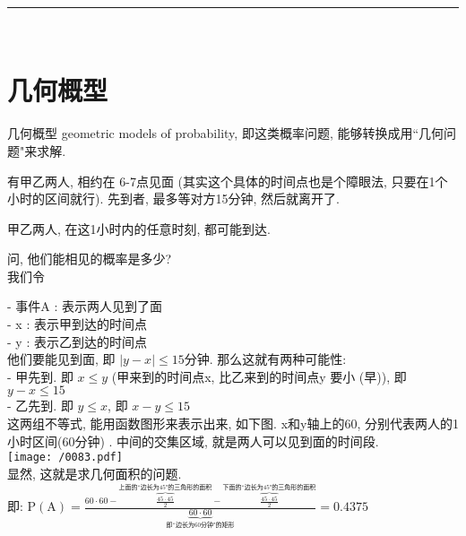 \documentclass[UTF8]{ctexart}
\begin{document}
~\\
\hrule
~\\


\section{几何概型}


几何概型 geometric models of probability, 即这类概率问题, 能够转换成用``几何问题"来求解.

\begin{myEnvSample}
	有甲乙两人, 相约在 6-7点见面 (其实这个具体的时间点也是个障眼法, 只要在1个小时的区间就行). 先到者, 最多等对方15分钟, 然后就离开了.
	
	甲乙两人, 在这1小时内的任意时刻, 都可能到达.
	
	问, 他们能相见的概率是多少? \\
	
	我们令 
	
	- 事件A : 表示两人见到了面 \\
	- x : 表示甲到达的时间点 \\
	- y : 表示乙到达的时间点 \\
	
	他们要能见到面, 即 $|y-x| \leq 15$分钟. 那么这就有两种可能性: \\
	-  甲先到. 即 $x \leq y$ (甲来到的时间点x, 比乙来到的时间点y 要小 (早)), 即 $ y-x \leq 15$ \\
	-  乙先到. 即 $y \leq x$, 即 $ x-y \leq 15$ \\	
	
	这两组不等式, 能用函数图形来表示出来, 如下图. x和y轴上的60, 分别代表两人的1小时区间(60分钟) . 中间的交集区域, 就是两人可以见到面的时间段. \\
	\texttt{[image: /0083.pdf]} \\
	
	显然, 这就是求几何面积的问题. \\
	
	即: $
	\text{P}\left( \text{A} \right) =\frac{60\cdot 60-\overset{\text{上面的``边长为45"的三角形的面积}}{\overbrace{\frac{45\cdot 45}{2}}}-\overset{\text{下面的``边长为45"的三角形的面积}}{\overbrace{\frac{45\cdot 45}{2}}}}{\underset{\text{即``边长为60分钟"的矩形}}{\underbrace{60\cdot 60}}}=0.4375
	$
\end{myEnvSample} 
\vspace{1em} 
\end{document}
